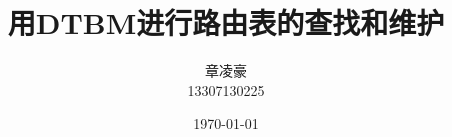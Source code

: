 \documentclass[12pt]{article}
\begin{document}
\pagestyle{fancy}
\lhead{\textbf{{\thetitle}}}
\rhead{\textbf{\nouppercase{\firstleftmark}}}
\cfoot{\thepage}

\title{\textbf{用DTBM进行路由表的查找和维护}}
\author{章凌豪\\13307130225}
\date{\today}
\maketitle

\tableofcontents
\clearpage






\end{document}
